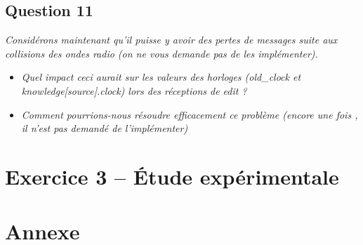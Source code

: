 \documentclass[11pt,a4paper,sans]{report}
\begin{document}
	\section{Question 11}
	\textit{Considérons maintenant qu’il puisse y avoir des pertes de messages suite aux collisions des ondes radio (on ne vous demande pas de les implémenter).}
	\begin{itemize}
		\item \textit{Quel impact ceci aurait sur les valeurs des horloges (old\_clock et knowledge[source].clock) lors des réceptions de edit ?}
		\item \textit{Comment pourrions-nous résoudre efficacement ce problème (encore une fois , il n’est pas demandé de l’implémenter)}
	\end{itemize}

	\newpage
	\chapter{Exercice 3 – Étude expérimentale}

	\newpage
	
	

	\newpage
	\listoffigures



	\newpage
	\chapter{Annexe}
\end{document}
